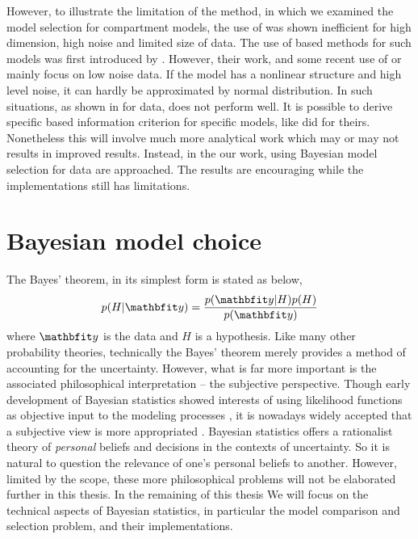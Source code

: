 However, to illustrate the limitation of the \aicc method, in
\cite{Zhou:2011uo} which we examined the model selection for compartment
models, the use of \aicc was shown inefficient for high dimension, high noise
and limited size of data. The use of \aic based methods for such models was
first introduced by \cite{Hawkins:1986ha}. However, their work, and some
recent use of \aic or \aicc mainly focus on low noise data. If the model has a
nonlinear structure and high level noise, it can hardly be approximated by
normal distribution. In such situations, as shown in \cite{Zhou:2011uo}
for \pet data, \aicc does not perform well. It is possible to derive specific
\aic based information criterion for specific models, like
\cite{Hurvich:1989ev} did for theirs. Nonetheless this will involve much
more analytical work which may or may not results in improved results.
Instead, in the our work, using Bayesian model selection for \pet data are
approached. The results are encouraging while the implementations still has
limitations.

\section{Bayesian model choice}
\label{sec:Bayesian model choice}

The Bayes' theorem, in its simplest form is stated as below,
\begin{equation}
  p(H|\data) = \frac{p(\data|H)p(H)}{p(\data)} \label{eq:bayes}
\end{equation}
where $\data$ is the data and $H$ is a hypothesis. Like many other probability
theories, technically the Bayes' theorem merely provides a method of
accounting for the uncertainty. However, what is far more important is the
associated philosophical interpretation -- the subjective perspective. Though
early development of Bayesian statistics showed interests of using likelihood
functions as objective input to the modeling processes
\cite{Jeffreys:1961ua, Jeffreys:1946jf}, it is nowadays widely accepted
that a subjective view is more appropriated
\cite[see][chap.~1]{Bernardo:1994vd}. Bayesian statistics offers a
rationalist theory of \emph{personal} beliefs and decisions in the contexts of
uncertainty. So it is natural to question the relevance of one's personal
beliefs to another. However, limited by the scope, these more philosophical
problems will not be elaborated further in this thesis. In the remaining of
this thesis We will focus on the technical aspects of Bayesian statistics, in
particular the model comparison and selection problem, and their
implementations.

